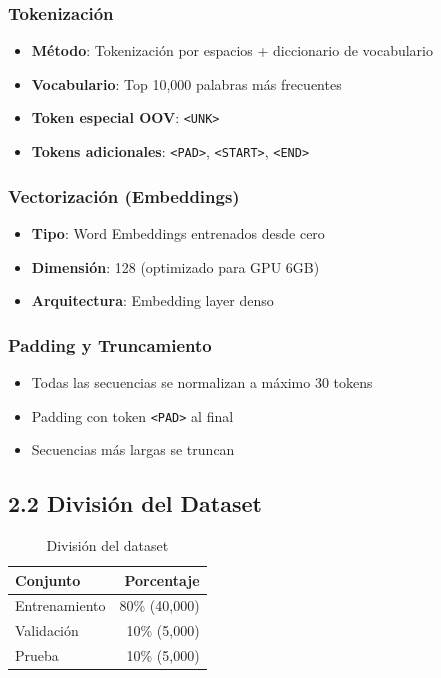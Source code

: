 \documentclass[12pt,a4paper]{article}
\begin{document}
\subsubsection{Tokenización}
\begin{itemize}
    \item \textbf{Método}: Tokenización por espacios + diccionario de vocabulario
    \item \textbf{Vocabulario}: Top 10,000 palabras más frecuentes
    \item \textbf{Token especial OOV}: \texttt{<UNK>}
    \item \textbf{Tokens adicionales}: \texttt{<PAD>}, \texttt{<START>}, \texttt{<END>}
\end{itemize}

\subsubsection{Vectorización (Embeddings)}
\begin{itemize}
    \item \textbf{Tipo}: Word Embeddings entrenados desde cero
    \item \textbf{Dimensión}: 128 (optimizado para GPU 6GB)
    \item \textbf{Arquitectura}: Embedding layer denso
\end{itemize}

\subsubsection{Padding y Truncamiento}
\begin{itemize}
    \item Todas las secuencias se normalizan a máximo 30 tokens
    \item Padding con token \texttt{<PAD>} al final
    \item Secuencias más largas se truncan
\end{itemize}

\subsection{2.2 División del Dataset}
\begin{table}[H]
    \centering
    \begin{tabular}{lr}
        \toprule
        \textbf{Conjunto} & \textbf{Porcentaje} \\
        \midrule
        Entrenamiento & 80\% (40,000) \\
        Validación & 10\% (5,000) \\
        Prueba & 10\% (5,000) \\
        \bottomrule
    \end{tabular}
    \caption{División del dataset}
\end{table}
\end{document}
